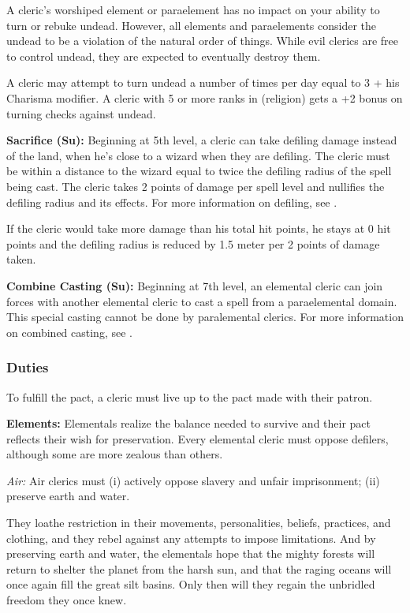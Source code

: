 A cleric's worshiped element or paraelement has no impact on your ability to turn or rebuke undead. However, all elements and paraelements consider the undead to be a violation of the natural order of things. While evil clerics are free to control undead, they are expected to eventually destroy them.

A cleric may attempt to turn undead a number of times per day equal to 3 + his Charisma modifier. A cleric with 5 or more ranks in  (religion) gets a +2 bonus on turning checks against undead.

\textbf{Sacrifice (Su):} Beginning at 5th level, a cleric can take defiling damage instead of the land, when he's close to a wizard when they are defiling. The cleric must be within a distance to the wizard equal to twice the defiling radius of the spell being cast. The cleric takes 2 points of damage per spell level and nullifies the defiling radius and its effects. For more information on defiling, see .

If the cleric would take more damage than his total hit points, he stays at 0 hit points and the defiling radius is reduced by 1.5 meter per 2 points of damage taken.

\textbf{Combine Casting (Su):} Beginning at 7th level, an elemental cleric can join forces with another elemental cleric to cast a spell from a paraelemental domain. This special casting cannot be done by paralemental clerics. For more information on combined casting, see .

\subsubsection{Duties}
To fulfill the pact, a cleric must live up to the pact made with their patron.

\textbf{Elements:} Elementals realize the balance needed to survive and their pact reflects their wish for preservation. Every elemental cleric must oppose defilers, although some are more zealous than others.

\textit{Air:} Air clerics must
	(i) actively oppose slavery and unfair imprisonment;
	(ii) preserve earth and water.

They loathe restriction in their movements, personalities, beliefs, practices, and clothing, and they rebel against any attempts to impose limitations. And by preserving earth and water, the elementals hope that the mighty forests will return to shelter the planet from the harsh sun, and that the raging oceans will once again fill the great silt basins. Only then will they regain the unbridled freedom they once knew.

